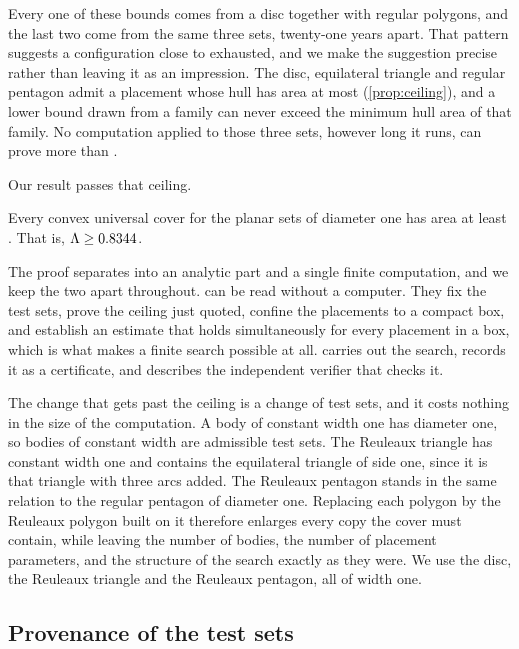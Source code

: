 \documentclass[a4paper,UKenglish,cleveref,autoref,thm-restate,numberwithinsect]{lipics-v2021}
\begin{document}
Every one of these bounds comes from a disc together with regular polygons, and
the last two come from the same three sets, twenty-one years apart. That pattern
suggests a configuration close to exhausted, and we make the suggestion precise
rather than leaving it as an impression. The
disc, equilateral triangle and regular pentagon admit a placement whose hull has
area at most \ClassicalCeiling{} (\cref{prop:ceiling}), and a lower bound drawn
from a family can never exceed the minimum hull area of that family. No
computation applied to those three sets, however long it runs, can prove more
than \ClassicalCeiling{}.

Our result passes that ceiling.

\begin{theorem}
\label{thm:main}
Every convex universal cover for the planar sets of diameter one has area at
least \MainBound{}. That is, $\Lambda \ge 0.8344$.
\end{theorem}

The proof separates into an analytic part and a single finite computation, and we
keep the two apart throughout.
 can be read without a computer. They
fix the test sets, prove the ceiling just quoted, confine the placements to a
compact box, and establish an estimate that holds simultaneously for every
placement in a box, which is what makes a finite search possible at all.
 carries out the search, records it as a certificate, and
describes the independent verifier that checks it.

The change that gets past the ceiling is a change of test sets, and it costs
nothing in the size of the computation. A body of constant width one has diameter
one, so bodies of constant width are admissible test sets. The Reuleaux triangle
has constant width one and contains the equilateral triangle of side one, since
it is that triangle with three arcs added. The Reuleaux pentagon stands in the
same relation to the regular pentagon of diameter one. Replacing each polygon by
the Reuleaux polygon built on it therefore enlarges every copy the cover must
contain, while leaving the number of bodies, the number of placement parameters,
and the structure of the search exactly as they were. We use the disc, the
Reuleaux triangle and the Reuleaux pentagon, all of width one.


\subsection{Provenance of the test sets}
\label{sec:contributions}
\end{document}
